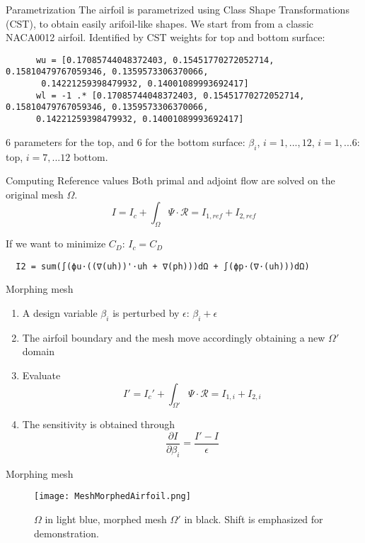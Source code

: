 \begin{frame}[fragile]{Parametrization}
    The airfoil is parametrized using Class Shape Transformations (CST), to obtain easily arifoil-like shapes.
    We start from from a classic NACA0012 airfoil.
    Identified by CST weights for top and bottom surface:
    \begin{verbatim}
      wu = [0.17085744048372403, 0.15451770272052714, 0.15810479767059346, 0.1359573306370066,
       0.14221259398479932, 0.14001089993692417]
      wl = -1 .* [0.17085744048372403, 0.15451770272052714, 0.15810479767059346, 0.1359573306370066, 
      0.14221259398479932, 0.14001089993692417]
    \end{verbatim}
    6 parameters for the top, and 6 for the bottom surface: $\beta_i$, $i=1,...,12$, $i=1,...6$: top, $i=7,...12$ bottom.
    
\end{frame}

\begin{frame}[fragile]{Computing Reference values}
Both primal and adjoint flow are solved on the original mesh $\Omega$.
$$I = I_c + \int_\Omega\Psi\cdot\mathcal{R} = I_{1,ref}+I_{2,ref} $$

If we want to minimize $C_D$: $I_c=C_D$
\begin{verbatim}
  I2 = sum(∫(ϕu⋅((∇(uh))'⋅uh + ∇(ph)))dΩ + ∫(ϕp⋅(∇⋅(uh)))dΩ)
\end{verbatim}
\end{frame}


\begin{frame}{Morphing mesh}
  \begin{enumerate}
    \item A design variable $\beta_i$ is perturbed by $\epsilon$:  $\beta_i+\epsilon$ 
    \item The airfoil boundary and the mesh move accordingly obtaining a new $\Omega'$ domain
    \item Evaluate $$I' = I_c' + \int_{\Omega'}\Psi\cdot\mathcal{R} = I_{1,i}+I_{2,i} $$
    \item The sensitivity is obtained through
      $$ \dfrac{\partial I }{\partial \beta _ i} = \dfrac{I'-I}{\epsilon}$$
\end{enumerate}

\end{frame}



\begin{frame}{Morphing mesh}
  \begin{figure}[h]
     \texttt{[image: MeshMorphedAirfoil.png]}
    \caption{$\Omega$ in light blue, morphed mesh $\Omega'$ in black. Shift is emphasized for demonstration.}
    \end{figure} 
\end{frame}

